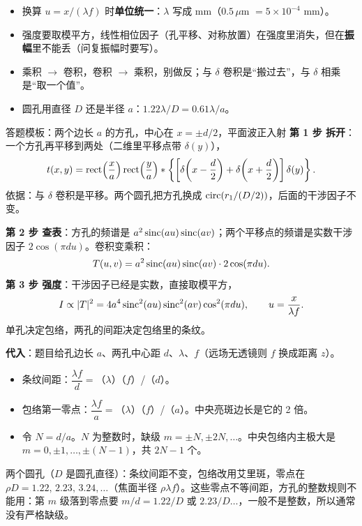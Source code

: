 \begin{warn}[题型 1–5 共同的易错点]
\begin{itemize}
\item 换算 $u=x/(\lambda f)$ 时\textbf{单位统一}：$\lambda$ 写成 mm（$0.5\,\mu$m $=5\times10^{-4}$ mm）。
\item 强度要取模平方，线性相位因子（孔平移、对称放置）在强度里消失，但在\textbf{振幅}里不能丢（问复振幅时要写）。
\item 乘积 $\to$ 卷积，卷积 $\to$ 乘积，别做反；与 $\delta$ 卷积是“搬过去”，与 $\delta$ 相乘是“取一个值”。
\item 圆孔用直径 $D$ 还是半径 $a$：$1.22\lambda/D=0.61\lambda/a$。
\end{itemize}
\end{warn}


\begin{exam}{答题模板：两个边长 $a$ 的方孔，中心在 $x=\pm d/2$，平面波正入射}
\textbf{第 1 步 拆开}：一个方孔再平移到两处（二维里平移点带 $\delta(y)$），
\[
t(x,y)=\operatorname{rect}\!\left(\frac xa\right)\operatorname{rect}\!\left(\frac ya\right)\ast\left\{\left[\delta\!\left(x-\frac d2\right)+\delta\!\left(x+\frac d2\right)\right]\delta(y)\right\}.
\]
依据：与 $\delta$ 卷积是平移。两个圆孔把方孔换成 $\operatorname{circ}(r_1/(D/2))$，后面的干涉因子不变。

\textbf{第 2 步 查表}：方孔的频谱是 $a^2\operatorname{sinc}(au)\operatorname{sinc}(av)$；两个平移点的频谱是实数干涉因子 $2\cos(\pi du)$。卷积变乘积：
\[
T(u,v)=a^2\operatorname{sinc}(au)\operatorname{sinc}(av)\cdot 2\cos(\pi du).
\]
\textbf{第 3 步 强度}：干涉因子已经是实数，直接取模平方，
\[
I\propto|T|^2=4a^4\operatorname{sinc}^2(au)\operatorname{sinc}^2(av)\cos^2(\pi du),\qquad u=\frac{x}{\lambda f}.
\]
单孔决定包络，两孔的间距决定包络里的条纹。

\textbf{代入}：题目给孔边长 $a$、两孔中心距 $d$、$\lambda$、$f$（远场无透镜则 $f$ 换成距离 $z$）。
\begin{itemize}
\item 条纹间距：$\dfrac{\lambda f}{d}=$（$\lambda$）（$f$）/（$d$）。
\item 包络第一零点：$\dfrac{\lambda f}{a}=$（$\lambda$）（$f$）/（$a$）。中央亮斑边长是它的 2 倍。
\item 令 $N=d/a$。$N$ 为整数时，缺级 $m=\pm N,\pm 2N,\dots$。中央包络内主极大是 $m=0,\pm1,\dots,\pm(N-1)$，共 $2N-1$ 个。
\end{itemize}
两个圆孔（$D$ 是圆孔直径）：条纹间距不变，包络改用艾里斑，零点在 $\rho D=1.22,\,2.23,\,3.24,\dots$（焦面半径 $\rho\lambda f$）。这些零点不等间距，方孔的整数规则不能用：第 $m$ 级落到零点要 $m/d=1.22/D$ 或 $2.23/D\dots$，一般不是整数，所以通常没有严格缺级。
\end{exam}


